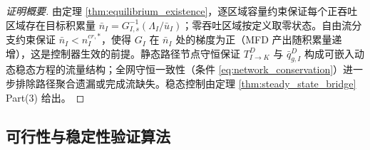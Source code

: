 \documentclass[a4paper,12pt]{article}
\theoremstyle{plain}
\theoremstyle{definition}
\theoremstyle{remark}
\begin{document}
\begin{proof}[证明概要]
由定理 \ref{thm:equilibrium_existence}，逐区域容量约束保证每个正吞吐区域存在目标积累量 $\bar{n}_I = G_{I,s}^{-1}(\Lambda_I/\bar u_I)$；零吞吐区域按定义取零状态。自由流分支约束保证 $\bar{n}_I < n_I^{cr,*}$，使得 $G_I$ 在 $\bar{n}_I$ 处的梯度为正（MFD 产出随积累量递增），这是控制器生效的前提。静态路径节点守恒保证 $T_{I\to K}^D$ 与 $\bar q_{g,I}^D$ 构成可嵌入动态稳态方程的流量结构；全网守恒一致性（条件 \ref{eq:network_conservation}）进一步排除路径聚合遗漏或完成流缺失。稳态控制由定理 \ref{thm:steady_state_bridge} Part(3) 给出。
\end{proof}

\subsection{可行性与稳定性验证算法}
\end{document}
